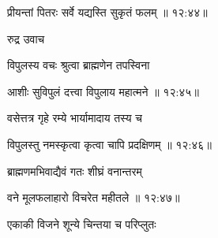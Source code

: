 
{\devanagarifont प्रीयन्तां पितरः सर्वे यद्यस्ति सुकृतं फलम् {॥ १२:४४॥} \veg\dontdisplaylinenum }%

{\devanagarifont रुद्र उवाच {\dandab}\dontdisplaylinenum  }%

{\devanagarifont विपुलस्य वचः श्रुत्वा ब्राह्मणेन तपस्विना \thinspace{\danda} \dontdisplaylinenum }%


{\devanagarifont आशीः सुविपुलं दत्त्वा विपुलाय महात्मने {॥ १२:४५॥} \veg\dontdisplaylinenum }%
 
{\devanagarifont वसेत्तत्र गृहे रम्ये भार्यामादाय तस्य च \thinspace{\dandab} \dontdisplaylinenum }%


{\devanagarifont विपुलस्तु नमस्कृत्वा कृत्वा चापि प्रदक्षिणम् {॥ १२:४६॥} \veg\dontdisplaylinenum }%

{\devanagarifont ब्राह्मणमभिवाद्यैवं गतः शीघ्रं वनान्तरम् \thinspace{\dandab} \dontdisplaylinenum }%


{\devanagarifont वने मूलफलाहारो विचरेत महीतले {॥ १२:४७॥} \veg\dontdisplaylinenum }%

{\devanagarifont एकाकी विजने शून्ये चिन्तया च परिप्लुतः \thinspace{\dandab} \dontdisplaylinenum }%

